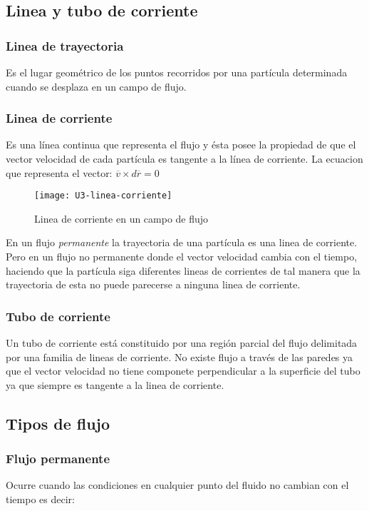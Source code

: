 \subsection{Linea y tubo de corriente}

\subsubsection{Linea de trayectoria}
Es el lugar geométrico de los puntos recorridos por una partícula determinada cuando se desplaza en un campo de flujo.

\subsubsection{Linea de corriente}
Es una línea continua que representa el flujo y ésta posee la propiedad de que el vector velocidad de cada partícula es tangente a la línea de corriente. La ecuacion que representa el vector: $ \overline{v} \times d\overline{r} = 0$

\begin{figure}[h]
	\centering
	\texttt{[image: U3-linea-corriente]}
	\caption{Linea de corriente en un campo de flujo}
\end{figure}

En un flujo \emph{permanente} la trayectoria de una partícula es una linea de corriente. Pero en un flujo no permanente donde el vector velocidad cambia con el tiempo, haciendo que la partícula siga diferentes lineas de corrientes de tal manera que la trayectoria de esta no puede parecerse a ninguna linea de corriente.

\subsubsection{Tubo de corriente}
Un tubo de corriente está constituido por una región parcial del flujo delimitada por una familia de lineas de corriente. No existe flujo a través de las paredes ya que el vector velocidad no tiene componete perpendicular a la superficie del tubo ya que siempre es tangente a la linea de corriente.

\subsection{Tipos de flujo}
\subsubsection{Flujo permanente}
Ocurre cuando las condiciones en cualquier punto del fluido no cambian con el tiempo es decir:

